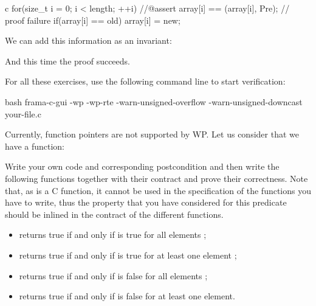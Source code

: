 \begin{CodeBlock}{c}
for(size_t i = 0; i < length; ++i){
    //@assert array[i] == \at(array[i], Pre); // proof failure
    if(array[i] == old) array[i] = new;
}
\end{CodeBlock}



We can add this information as an invariant:






And this time the proof succeeds.




For all these exercises, use the following command line to start verification:

\begin{CodeBlock}{bash}
frama-c-gui -wp -wp-rte -warn-unsigned-overflow -warn-unsigned-downcast your-file.c
\end{CodeBlock}



Currently, function pointers are not supported by WP. Let us consider that
we have a function:




Write your own code and corresponding postcondition and then write the
following functions together with their contract and prove their correctness.
Note that, as  is a C function, it cannot be used in the
specification of the functions you have to write, thus the property that you
have considered for this predicate should be inlined in the contract of the
different functions.

\begin{itemize}
\item {} returns true if and only if 
  is true for all elements ;
\item {} returns true if and only if 
  is true for at least one element ;
\item {} returns true if and only if 
  is false for all elements ;
\item {} returns true if and only if 
  is false for at least one element.
\end{itemize}

